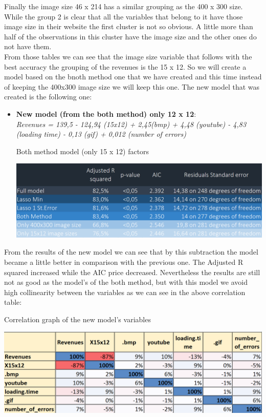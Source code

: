 \documentclass{book}
\begin{document}
Finally the image size 46 x 214 has a similar grouping as the 400 x 300 size. While the group 2 is clear that all the variables that belong to it have those image size in their website the first cluster is not so obvious. A little more than half of the observations in this cluster have the image size and the other ones do not have them.\\
From those tables we can see that the image size variable that follows with the best accuracy the grouping of the revenues is the 15 x 12. So we will create a model based on the bnoth method one that we have created and this time instead of keeping the 400x300 image size we will keep this one. The new model that was created is the following one:
\begin{itemize}
\item \textbf{New model (from the both method) only 12 x 12}:\\
\textit{Revenues = 139,5 - 124,94 (15x12) + 2,45(bmp) + 4,48 (youtube) - 4,83 (loading time) - 0,13 (gif) + 0,012 (number of errors) }
\begin{table}[H]
\centering
\caption{Both method model (only 15 x 12) factors}
\includegraphics[scale=0.6]{../R/photos/0001_f_f3_f4_ma_f5_f6.PNG} 
\end{table}
\end{itemize}

From the results of the new model we can see that by this subtraction the model became a little better in comparison with the previous one. The Adjusted R squared increased while the AIC price decreased. Nevertheless the results are still not as good as the model's of the both method, but with this model we avoid high collinearity between the variables as we can see in the above correlation table:
\begin{table}[H]
\centering
\caption{Correlation graph of the new model's variables}
\begin{center}
\includegraphics[scale=0.6]{../R/photos/86_model_cor_4.png}     \\
\end{center}
\end{table}
\newpage
\end{document}

